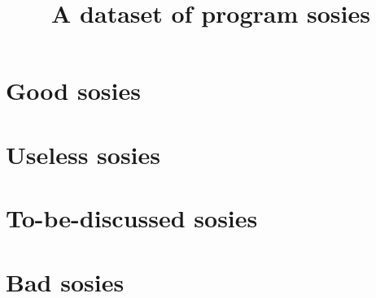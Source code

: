 \documentclass[table]{sig-alternate}
\title{A dataset of program sosies}
\author{}
\begin{document}
\maketitle

\section{Good sosies}





\section{Useless sosies}
\label{sec:useless}

\section{To-be-discussed sosies}




\section{Bad sosies}


% 
% 
\end{document}
